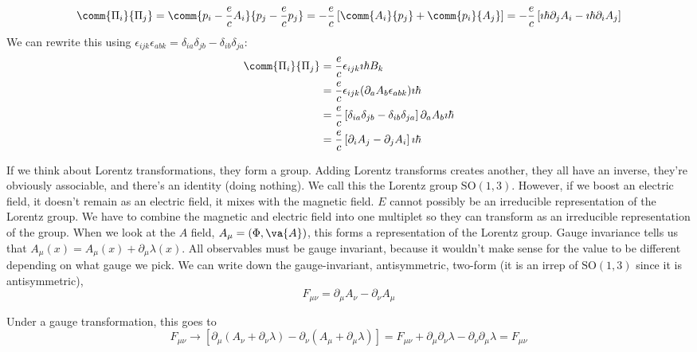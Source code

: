 \documentclass[a4paper,twoside,master.tex]{subfiles}
\begin{document}
\begin{equation}
    \comm{\Pi_i}{\Pi_j} = \comm{p_i - \frac{e}{c} A_i}{p_j - \frac{e}{c} p_j} = - \frac{e}{c} \left[ \comm{A_i}{p_j} + \comm{p_i}{A_j} \right] = - \frac{e}{c} \left[ \imath \hbar \partial_j A_i - \imath \hbar \partial_i A_j \right]
\end{equation}
We can rewrite this using $ \epsilon_{ijk} \epsilon_{abk} = \delta_{ia} \delta_{jb} - \delta_{ib} \delta_{ja} $:
\begin{align}
    \comm{\Pi_i}{\Pi_j} &= \frac{e}{c} \epsilon_{ijk} \imath \hbar  B_k \\
    &= \frac{e}{c} \epsilon_{ijk} (\partial_a A_b \epsilon_{abk}) \imath \hbar \\
    &= \frac{e}{c} \left[ \delta_{ia} \delta_{jb} - \delta_{ib} \delta_{ja} \right] \partial_a A_b \imath \hbar \\
    &= \frac{e}{c} \left[ \partial_i A_j - \partial_j A_i \right] \imath \hbar
\end{align}

If we think about Lorentz transformations, they form a group. Adding Lorentz transforms creates another, they all have an inverse, they're obviously associable, and there's an identity (doing nothing). We call this the Lorentz group $ \text{SO}(1,3) $. However, if we boost an electric field, it doesn't remain as an electric field, it mixes with the magnetic field. $ E $ cannot possibly be an irreducible representation of the Lorentz group. We have to combine the magnetic and electric field into one multiplet so they can transform as an irreducible representation of the group. When we look at the $ A $ field, $ A_{\mu} = (\Phi, \va{A}) $, this forms a representation of the Lorentz group. Gauge invariance tells us that $ A_{\mu}(x) = A_{\mu}(x) + \partial_{\mu} \lambda(x) $. All observables must be gauge invariant, because it wouldn't make sense for the value to be different depending on what gauge we pick. We can write down the gauge-invariant, antisymmetric, two-form (it is an irrep of $ \text{SO}(1,3) $ since it is antisymmetric),
\begin{equation}
    F_{\mu \nu} = \partial_{\mu} A_{\nu} - \partial_{\nu} A_{\mu}
\end{equation}

Under a gauge transformation, this goes to
\begin{equation}
    F_{\mu \nu} \to \left[ \partial_{\mu} (A_{\nu} + \partial_{\nu} \lambda) - \partial_{\nu} (A_{\mu} + \partial_{\mu} \lambda) \right] = F_{\mu \nu} + \partial_{\mu} \partial_{\nu} \lambda - \partial_{\nu} \partial_{\mu} \lambda = F_{\mu \nu}
\end{equation}
\end{document}
